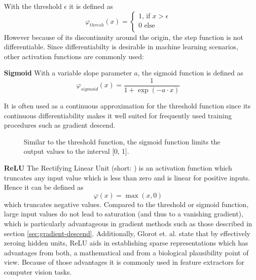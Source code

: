 		With the threshold $\epsilon$ it is defined as
		\begin{equation}
		\label{eq:acti-sw}
		\varphi_{thresh}(x) = \left\{
		\begin{array}{ll}
		1\text{, if } x > \epsilon \\
		0 \text{ else}\\
		\end{array}
		\right.
		\end{equation}
		However because of its discontinuity around the origin, the step function is not differentiable. Since differentiabilty is desirable in machine learning scenarios, other activation functions are commonly used:
		
		\textbf{Sigmoid}
		With a variable slope parameter $a$, the sigmoid function is defined as
		\begin{equation}
		\varphi_{sigmoid}(x) = \frac{1}{1+\exp(-a \cdot x)}
		\end{equation}
		
		It is often used as a continuous approximation for the threshold function since its continuous differentiability makes it well suited for frequently used training procedures such as gradient descend.\\
		
		\begin{figure}[ht]
			\centering
			\caption{Similar to the threshold function, the sigmoid function limits the output values to the interval [0, 1].}
			\label{fig:sigmoid_plot}
		\end{figure}
		
		
		\textbf{ReLU}
		The Rectifying Linear Unit (short: ) is an activation function which truncates any input value which is less than zero and is linear for positive inputs. Hence it can be defined as
		\begin{equation}
		\label{eq:relu_def}
		\varphi(x) = \max(x, 0)
		\end{equation}
		which truncates negative values. Compared to the threshold or sigmoid function, large input values do not lead to saturation (and thus to a vanishing gradient), which is particularly advantageous in gradient methods such as those described in section \ref{sec:gradient-descend}. Additionally, Glorot et. al. \cite{Glorot2011} state that by effectively zeroing hidden units, ReLU aids in establishing sparse representations which has advantages from both, a mathematical and from a biological plausibility point of view. Because of those advantages it is commonly used in feature extractors for computer vision tasks. \\
		
